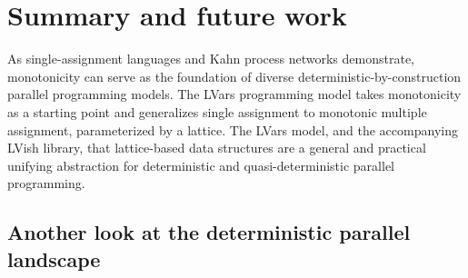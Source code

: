 \chapter{Summary and future work}\label{ch:conclusion} %

As single-assignment languages and Kahn process networks demonstrate,
monotonicity can serve as the foundation of diverse
deterministic-by-construction parallel programming models.  The LVars
programming model takes monotonicity as a starting point and
generalizes single assignment to monotonic multiple assignment,
parameterized by a lattice.  The LVars model, and the accompanying
LVish library,  that lattice-based data structures are
a general and practical unifying abstraction for deterministic and
quasi-deterministic parallel  programming.

\ifdefined\DISSERTATION
\section{Another look at the deterministic parallel landscape}
\fi

